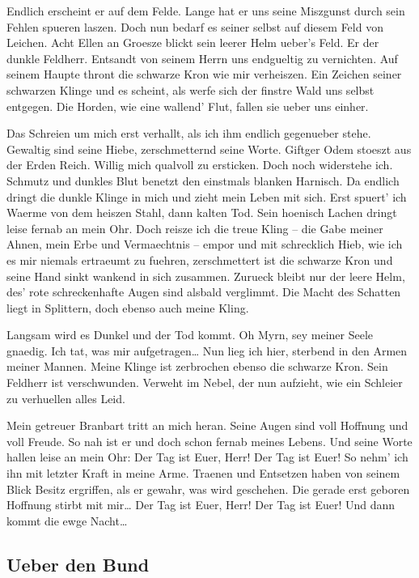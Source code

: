 \documentclass[a5paper,8pt]{book}
\begin{document}
Endlich erscheint er auf dem Felde. Lange hat er uns seine Miszgunst durch sein Fehlen spueren laszen. Doch nun bedarf es seiner selbst auf diesem Feld von Leichen. Acht Ellen an Groesze blickt sein leerer Helm ueber’s Feld. Er der dunkle Feldherr. Entsandt von seinem Herrn uns endgueltig zu vernichten. Auf seinem Haupte thront die schwarze Kron wie mir verheiszen. Ein Zeichen seiner schwarzen Klinge und es scheint, als werfe sich der finstre Wald uns selbst entgegen. Die Horden, wie eine wallend’ Flut, fallen sie ueber uns einher.

Das Schreien um mich erst verhallt, als ich ihm endlich gegenueber stehe. Gewaltig sind seine Hiebe, zerschmetternd seine Worte. Giftger Odem stoeszt aus der Erden Reich. Willig mich qualvoll zu ersticken. Doch noch widerstehe ich. Schmutz und dunkles Blut benetzt den einstmals blanken Harnisch. Da endlich dringt die dunkle Klinge in mich und zieht mein Leben mit sich. Erst spuert’ ich Waerme von dem heiszen Stahl, dann kalten Tod. Sein hoenisch Lachen dringt leise fernab an mein Ohr. Doch reisze ich die treue Kling – die Gabe meiner Ahnen, mein Erbe und Vermaechtnis – empor und mit schrecklich Hieb, wie ich es mir niemals ertraeumt zu fuehren, zerschmettert ist die schwarze Kron und seine Hand sinkt wankend in sich zusammen. Zurueck bleibt nur der leere Helm, des’ rote schreckenhafte Augen sind alsbald verglimmt. Die Macht des Schatten liegt in Splittern, doch ebenso auch meine Kling.

Langsam wird es Dunkel und der Tod kommt. Oh Myrn, sey meiner Seele gnaedig. Ich tat, was mir aufgetragen… Nun lieg ich hier, sterbend in den Armen meiner Mannen. Meine Klinge ist zerbrochen ebenso die schwarze Kron. Sein Feldherr ist verschwunden. Verweht im Nebel, der nun aufzieht, wie ein Schleier zu verhuellen alles Leid. 

Mein getreuer Branbart tritt an mich heran. Seine Augen sind voll Hoffnung und voll Freude. So nah ist er und doch schon fernab meines Lebens. Und seine Worte hallen leise an mein Ohr: Der Tag ist Euer, Herr! Der Tag ist Euer!
So nehm’ ich ihn mit letzter Kraft in meine Arme. Traenen und Entsetzen haben von seinem Blick Besitz ergriffen, als er gewahr, was wird geschehen. Die gerade erst geboren Hoffnung stirbt mit mir… Der Tag ist Euer, Herr! Der Tag ist Euer! Und dann kommt die ewge Nacht…
\newpage

\subsection{ Ueber den Bund}
\end{document}
